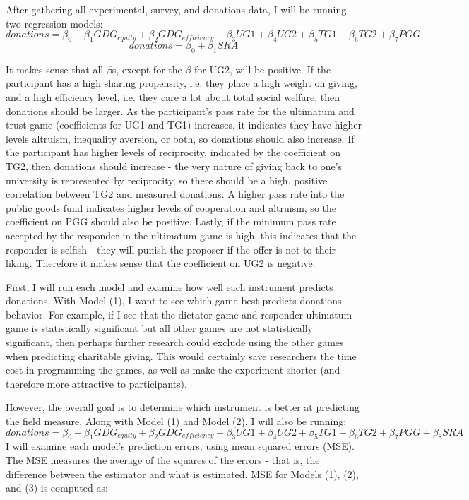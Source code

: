 \documentclass{article}
\begin{document}
After gathering all experimental, survey, and donations data, I will be running two regression models:
\begin{equation}
donations= \beta_{0} + \beta_{1} GDG_{equity}+ \beta_{2} GDG_{efficiency} + \beta_{3} UG1 + \beta_{4} UG2 + \beta_{5} TG1 + \beta_{6} TG2 + \beta_{7} PGG
\end{equation}
\begin{equation}
donations = \beta_{0} + \beta_{1} SRA
\end{equation}

It makes sense that all \(\beta\)s, except for the \(\beta\) for UG2, will be positive. If the participant has a high sharing propensity, i.e. they place a high weight on giving, and a high efficiency level, i.e. they care a lot about total social welfare, then donations should be larger. As the participant\rq s pass rate for the ultimatum and trust game (coefficients for UG1 and TG1) increases, it indicates they have higher levels altruism, inequality aversion, or both, so donations should also increase. If the participant has higher levels of reciprocity, indicated by the coefficient on TG2, then donations should increase - the very nature of giving back to one's university is represented by reciprocity, so there should be a high, positive correlation between TG2 and measured donations. A higher pass rate into the public goods fund indicates higher levels of cooperation and altruism, so the coefficient on PGG should also be positive. Lastly, if the minimum pass rate accepted by the responder in the ultimatum game is high, this indicates that the responder is selfish - they will punish the proposer if the offer is not to their liking. Therefore it makes sense that the coefficient on UG2 is negative. 

First, I will run each model and examine how well each instrument predicts donations. With Model (1), I want to see which game best predicts donations behavior. For example, if I see that the dictator game and responder ultimatum game is statistically significant but all other games are not statistically significant, then perhaps further research could exclude using the other games when predicting charitable giving. This would certainly save researchers the time cost in programming the games, as well as make the experiment shorter (and therefore more attractive to participants). 

However, the overall goal is to determine which instrument is better at predicting the field measure. Along with Model (1) and Model (2), I will also be running:
\begin{equation}
donations=\beta_{0} + \beta_{1} GDG_{equity} + \beta_{2} GDG_{efficiency} + \beta_{3} UG1 + \beta_{4} UG2 + \beta_{5} TG1 + \beta_{6} TG2 + \beta_{7} PGG + \beta_{8}SRA
\end{equation}
I will examine each model's prediction errors, using mean squared errors (MSE). The MSE measures the average of the squares of the errors - that is, the difference between the estimator and what is estimated. MSE for Models (1), (2), and (3) is computed as: \\
\end{document}

